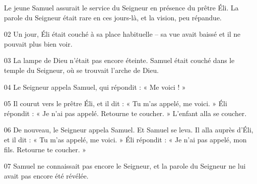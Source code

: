 Le jeune Samuel assurait le service du Seigneur en présence du prêtre Éli. La parole du Seigneur était rare en ces jours-là, et la vision, peu répandue.

02 Un jour, Éli était couché à sa place habituelle – sa vue avait baissé et il ne pouvait plus bien voir.

03 La lampe de Dieu n’était pas encore éteinte. Samuel était couché dans le temple du Seigneur, où se trouvait l’arche de Dieu.

04 Le Seigneur appela Samuel, qui répondit : « Me voici ! »

05 Il courut vers le prêtre Éli, et il dit : « Tu m’as appelé, me voici. » Éli répondit : « Je n’ai pas appelé. Retourne te coucher. » L’enfant alla se coucher.

06 De nouveau, le Seigneur appela Samuel. Et Samuel se leva. Il alla auprès d’Éli, et il dit : « Tu m’as appelé, me voici. » Éli répondit : « Je n’ai pas appelé, mon fils. Retourne te coucher. »

07 Samuel ne connaissait pas encore le Seigneur, et la parole du Seigneur ne lui avait pas encore été révélée.
